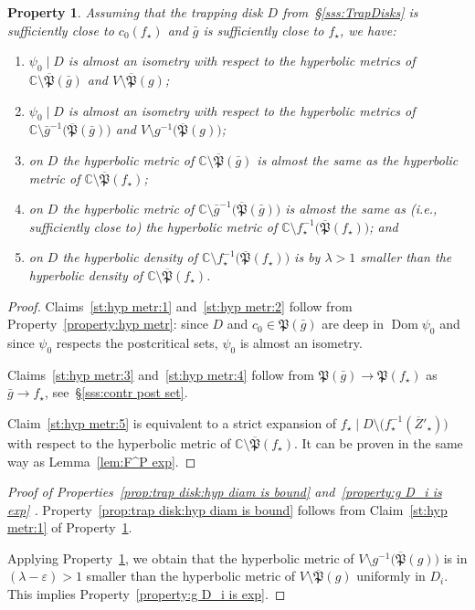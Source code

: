 \documentclass{amsart}
\newcommand{\Dom}{\operatorname {Dom}}
\newcommand{\1}{{\mathbb 1 }}
\newcommand\Post{{\mathfrak P}}
\newcommand\ovPost{{\overline{\mathfrak P}}}
\newcommand{\str}{{\star}}
\newcommand{\C}{\mathbb{C}}
\newtheorem{property}[thm]{Property}
\theoremstyle{remark}
\numberwithin{equation}{section}
\theoremstyle{definition}
\theoremstyle{nonumberbreak}
\begin{document}
\begin{property}
\label{st:hyp metr}
Assuming that the trapping disk $D$ from~\S\ref{sss:TrapDisks} is sufficiently close to $c_0(f_\str)$ and $\bar g$ is sufficiently close to $f_\str$, we have:
\begin{enumerate}
\item $\psi_0\mid D$ is almost an isometry with respect to the hyperbolic metrics of $\C\setminus \ovPost(\bar g)$ and $V\setminus \ovPost(g)$;
\label{st:hyp metr:1}
\item $\psi_0\mid D$ is almost an isometry with respect to the hyperbolic metrics of $\C\setminus \bar g^{-1}\big(\ovPost(\bar g)\big)$ and $V\setminus g^{-1}\big(\ovPost(g)\big)$;\label{st:hyp metr:2}
\item on $D$ the hyperbolic metric of $\C\setminus  \ovPost(\bar g)$ is almost the same as the hyperbolic metric of $\C\setminus \ovPost(f_\str)$;\label{st:hyp metr:3}
\item on $D$ the hyperbolic metric of $\C\setminus  \bar g^{-1}\big(\ovPost(\bar g)\big)$ is almost  the same as  (i.e., sufficiently close to)  the hyperbolic metric of $\C\setminus f_\str^{-1}\big(\ovPost(f_\str)\big)$; and \label{st:hyp metr:4}
\item on $D$ the hyperbolic density of $\C\setminus f_\str^{-1}\big(\ovPost(f_\str)\big)$ is by $\lambda>1$ smaller than the hyperbolic density of $\C\setminus \ovPost(f_\str)$.\label{st:hyp metr:5}
\end{enumerate}
\end{property}
\begin{proof}

Claims~\ref{st:hyp metr:1} and~\ref{st:hyp metr:2} follow from Property~\ref{property:hyp metr}: since $D$ and $c_0\in \Post(\bar g)$ are deep in $\Dom \psi_0$ and since $\psi_0$ respects the postcritical sets, $\psi_0$ is almost an isometry.

Claims~\ref{st:hyp metr:3} and~\ref{st:hyp metr:4} follow from $\Post(\bar g)\to \Post(f_\str)$ as $\bar g\to f_\str$, see~\S\ref{sss:contr post set}. 


Claim~\ref{st:hyp metr:5} is equivalent to a strict expansion of $f_\str\mid D\setminus \big( f_\str^{-1}(\overline Z'_\str)\big)$ with respect to the hyperbolic metric of  $\C\setminus \ovPost(f_\str)$. It can be proven in the same way as Lemma~\ref{lem:F^P exp}. 
\end{proof}


\begin{proof}[Proof of Properties~\ref{prop:trap disk:hyp diam is bound} and~\ref{property:g D_i is exp} ]
Property~\ref{prop:trap disk:hyp diam is bound} follows from Claim~\ref{st:hyp metr:1} of Property~\ref{st:hyp metr}. 

Applying Property~\ref{st:hyp metr}, we obtain that the hyperbolic metric of $V\setminus g^{-1}\big(\ovPost(g)\big)$ is in $(\lambda-\varepsilon)>1$ smaller than the hyperbolic metric of $V\setminus \ovPost(g)$ uniformly in $D_i$. This implies Property~\ref{property:g D_i is exp}.
\end{proof}
\end{document}
